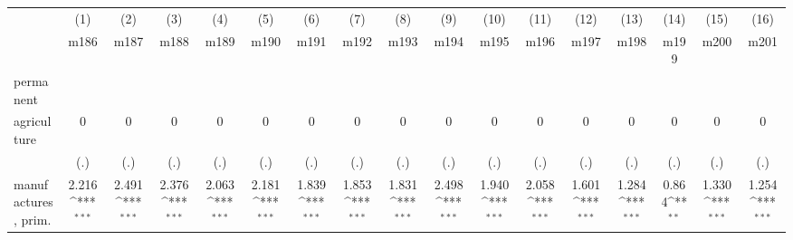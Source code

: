 {
\def\sym#1{\ifmmode^{#1}\else\(^{#1}\)\fi}
\begin{tabular}{l*{16}{c}}
\hline\hline
                    &\multicolumn{1}{c}{(1)}&\multicolumn{1}{c}{(2)}&\multicolumn{1}{c}{(3)}&\multicolumn{1}{c}{(4)}&\multicolumn{1}{c}{(5)}&\multicolumn{1}{c}{(6)}&\multicolumn{1}{c}{(7)}&\multicolumn{1}{c}{(8)}&\multicolumn{1}{c}{(9)}&\multicolumn{1}{c}{(10)}&\multicolumn{1}{c}{(11)}&\multicolumn{1}{c}{(12)}&\multicolumn{1}{c}{(13)}&\multicolumn{1}{c}{(14)}&\multicolumn{1}{c}{(15)}&\multicolumn{1}{c}{(16)}\\
                    &\multicolumn{1}{c}{m186}&\multicolumn{1}{c}{m187}&\multicolumn{1}{c}{m188}&\multicolumn{1}{c}{m189}&\multicolumn{1}{c}{m190}&\multicolumn{1}{c}{m191}&\multicolumn{1}{c}{m192}&\multicolumn{1}{c}{m193}&\multicolumn{1}{c}{m194}&\multicolumn{1}{c}{m195}&\multicolumn{1}{c}{m196}&\multicolumn{1}{c}{m197}&\multicolumn{1}{c}{m198}&\multicolumn{1}{c}{m199}&\multicolumn{1}{c}{m200}&\multicolumn{1}{c}{m201}\\
\hline
permanent           &                     &                     &                     &                     &                     &                     &                     &                     &                     &                     &                     &                     &                     &                     &                     &                     \\
agriculture         &           0         &           0         &           0         &           0         &           0         &           0         &           0         &           0         &           0         &           0         &           0         &           0         &           0         &           0         &           0         &           0         \\
                    &         (.)         &         (.)         &         (.)         &         (.)         &         (.)         &         (.)         &         (.)         &         (.)         &         (.)         &         (.)         &         (.)         &         (.)         &         (.)         &         (.)         &         (.)         &         (.)         \\
[1em]
manufactures, prim. &       2.216\sym{***}&       2.491\sym{***}&       2.376\sym{***}&       2.063\sym{***}&       2.181\sym{***}&       1.839\sym{***}&       1.853\sym{***}&       1.831\sym{***}&       2.498\sym{***}&       1.940\sym{***}&       2.058\sym{***}&       1.601\sym{***}&       1.284\sym{***}&       0.864\sym{**} &       1.330\sym{***}&       1.254\sym{***}\\

\end{tabular}}
